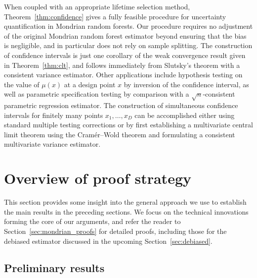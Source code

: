 When coupled with an appropriate lifetime selection method,
Theorem~\ref{thm:confidence} gives a fully feasible procedure for uncertainty
quantification in Mondrian random forests. Our procedure requires no adjustment
of the original Mondrian random forest estimator beyond ensuring that the bias
is negligible, and in particular does not rely on sample splitting. The
construction of confidence intervals is just one corollary of the weak
convergence result given in Theorem~\ref{thm:clt}, and follows immediately from
Slutsky's theorem with a consistent variance estimator. Other applications
include hypothesis testing on the value of $\mu(x)$ at a design point $x$ by
inversion of the confidence interval, as well as parametric specification
testing by comparison with a $\sqrt{n}$-consistent parametric regression
estimator. The construction of simultaneous confidence intervals for finitely
many points $x_1, \ldots, x_D$ can be accomplished either using standard
multiple testing corrections or by first establishing a multivariate central
limit theorem using the Cram{\'e}r--Wold theorem and formulating a consistent
multivariate variance estimator.

\section{Overview of proof strategy}%
\label{sec:overview_proofs}

This section provides some insight into the general approach we use to
establish the main results in the preceding sections. We focus on the technical
innovations forming the core of our arguments, and refer the reader to
Section~\ref{sec:mondrian_proofs} for detailed proofs, including those for the
debiased estimator discussed in the upcoming Section~\ref{sec:debiased}.

\subsection*{Preliminary results}

